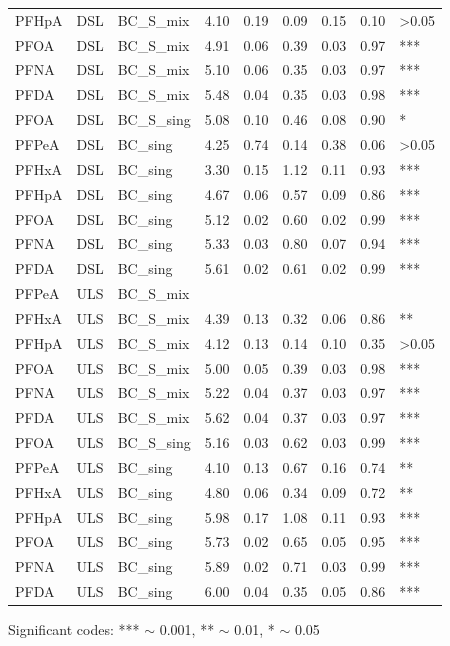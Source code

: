 \begin{table}
{\begin{threeparttable}
\begin{tabular}{lllllllll}
PFHpA & DSL & BC\_S\_mix & 4.10 & 0.19 & 0.09 & 0.15 & 0.10 & \textgreater{}0.05 \\
PFOA & DSL & BC\_S\_mix & 4.91 & 0.06 & 0.39 & 0.03 & 0.97 & *** \\
PFNA & DSL & BC\_S\_mix & 5.10 & 0.06 & 0.35 & 0.03 & 0.97 & *** \\
PFDA & DSL & BC\_S\_mix & 5.48 & 0.04 & 0.35 & 0.03 & 0.98 & *** \\
PFOA & DSL & BC\_S\_sing & 5.08 & 0.10 & 0.46 & 0.08 & 0.90 & * \\
PFPeA & DSL & BC\_sing & 4.25 & 0.74 & 0.14 & 0.38 & 0.06 & \textgreater{}0.05 \\
PFHxA & DSL & BC\_sing & 3.30 & 0.15 & 1.12 & 0.11 & 0.93 & *** \\
PFHpA & DSL & BC\_sing & 4.67 & 0.06 & 0.57 & 0.09 & 0.86 & *** \\
PFOA & DSL & BC\_sing & 5.12 & 0.02 & 0.60 & 0.02 & 0.99 & *** \\
PFNA & DSL & BC\_sing & 5.33 & 0.03 & 0.80 & 0.07 & 0.94 & *** \\
PFDA & DSL & BC\_sing & 5.61 & 0.02 & 0.61 & 0.02 & 0.99 & *** \\
\addlinespace 
PFPeA & ULS & BC\_S\_mix &  &  &  &  &  &  \\
PFHxA & ULS & BC\_S\_mix & 4.39 & 0.13 & 0.32 & 0.06 & 0.86 & ** \\
PFHpA & ULS & BC\_S\_mix & 4.12 & 0.13 & 0.14 & 0.10 & 0.35 & \textgreater{}0.05 \\
PFOA & ULS & BC\_S\_mix & 5.00 & 0.05 & 0.39 & 0.03 & 0.98 & *** \\
PFNA & ULS & BC\_S\_mix & 5.22 & 0.04 & 0.37 & 0.03 & 0.97 & *** \\
PFDA & ULS & BC\_S\_mix & 5.62 & 0.04 & 0.37 & 0.03 & 0.97 & *** \\
PFOA & ULS & BC\_S\_sing & 5.16 & 0.03 & 0.62 & 0.03 & 0.99 & *** \\
PFPeA & ULS & BC\_sing & 4.10 & 0.13 & 0.67 & 0.16 & 0.74 & ** \\
PFHxA & ULS & BC\_sing & 4.80 & 0.06 & 0.34 & 0.09 & 0.72 & ** \\
PFHpA & ULS & BC\_sing & 5.98 & 0.17 & 1.08 & 0.11 & 0.93 & *** \\
PFOA & ULS & BC\_sing & 5.73 & 0.02 & 0.65 & 0.05 & 0.95 & *** \\
PFNA & ULS & BC\_sing & 5.89 & 0.02 & 0.71 & 0.03 & 0.99 & *** \\
PFDA & ULS & BC\_sing & 6.00 & 0.04 & 0.35 & 0.05 & 0.86 & *** \\ \bottomrule
\end{tabular}
\begin{tablenotes}
\item Significant codes: *** $\sim$ 0.001, ** $\sim$ 0.01, * $\sim$ 0.05
\end{tablenotes}
\end{threeparttable}}
\end{table}

